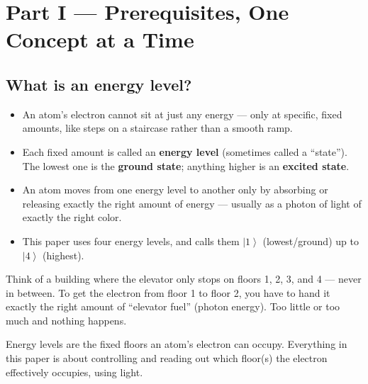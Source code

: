\documentclass[11pt]{article}
\newcommand{\ket}[1]{\left|#1\right\rangle}
\begin{document}
\section{Part I --- Prerequisites, One Concept at a Time}

\subsection*{What is an energy level?}
\begin{itemize}
\item An atom's electron cannot sit at just any energy --- only at specific, fixed amounts, like steps on a staircase rather than a smooth ramp.
\item Each fixed amount is called an \textbf{energy level} (sometimes called a ``state''). The lowest one is the \textbf{ground state}; anything higher is an \textbf{excited state}.
\item An atom moves from one energy level to another only by absorbing or releasing exactly the right amount of energy --- usually as a photon of light of exactly the right color.
\item This paper uses four energy levels, and calls them $\ket{1}$ (lowest/ground) up to $\ket{4}$ (highest).
\end{itemize}
\begin{plain}
Think of a building where the elevator only stops on floors 1, 2, 3, and 4 --- never in between. To get the electron from floor 1 to floor 2, you have to hand it exactly the right amount of ``elevator fuel'' (photon energy). Too little or too much and nothing happens.
\end{plain}
\begin{takeaway}
Energy levels are the fixed floors an atom's electron can occupy. Everything in this paper is about controlling and reading out which floor(s) the electron effectively occupies, using light.
\end{takeaway}
\end{document}

